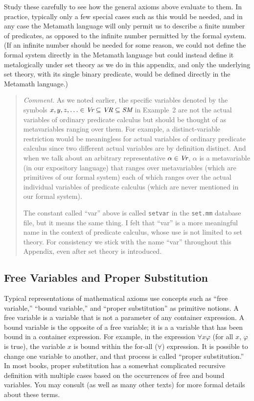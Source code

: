 Study these carefully to see how the general axioms above evaluate to
them.  In practice, typically only a few special cases such as this would be
needed, and in any case the Metamath language will only permit us to describe
a finite number of predicates, as opposed to the infinite number permitted by
the formal system.  (If an infinite number should be needed for some reason,
we could not define the formal system directly in the Metamath language but
could instead define it metalogically under set theory as we
do in this appendix, and only the underlying set theory, with its single
binary predicate, would be defined directly in the Metamath language.)


{\footnotesize\begin{quotation}
{\em Comment.}  As we noted earlier, the specific variables denoted by the
symbols $x,y,z,\ldots\in \mbox{\em Vr}\subseteq \mbox{\em VR}\subseteq
\mbox{\em SM}$ in Example~2 are not the actual variables of ordinary predicate
calculus but should be thought of as metavariables ranging over them.  For
example, a distinct-variable restriction would be meaningless for actual
variables of ordinary predicate calculus since two different actual variables
are by definition distinct.  And when we talk about an arbitrary
representative $\alpha\in \mbox{\em Vr}$, $\alpha$ is a metavariable (in our
expository language) that ranges over metavariables (which are primitives of
our formal system) each of which ranges over the actual individual variables
of predicate calculus (which are never mentioned in our formal system).

The constant called ``var'' above is called \texttt{setvar} in the
\texttt{set.mm} database file, but it means the same thing.  I felt
that ``var'' is a more meaningful name in the context of predicate
calculus, whose use is not limited to set theory.  For consistency we
stick with the name ``var'' throughout this Appendix, even after set
theory is introduced.
\end{quotation}}

\subsection{Free Variables and Proper Substitution}

Typical representations of mathematical axioms use concepts such
as ``free variable,'' ``bound variable,'' and ``proper substitution''
as primitive notions.
A free variable is a variable that
is not a parameter of any container expression.
A bound variable is the opposite of a free variable; it is a
a variable that has been bound in a container expression.
For example, in the expression $\forall x \varphi$ (for all $x$, $\varphi$
is true), the variable $x$
is bound within the for-all ($\forall$) expression.
It is possible to change one variable to another, and that process is called
``proper substitution.''
In most books, proper substitution has a somewhat complicated recursive
definition with multiple cases based on the occurrences of free and
bound variables.
You may consult
\cite[ch.\ 3--4]{Hamilton} (as well as
many other texts) for more formal details about these terms.

